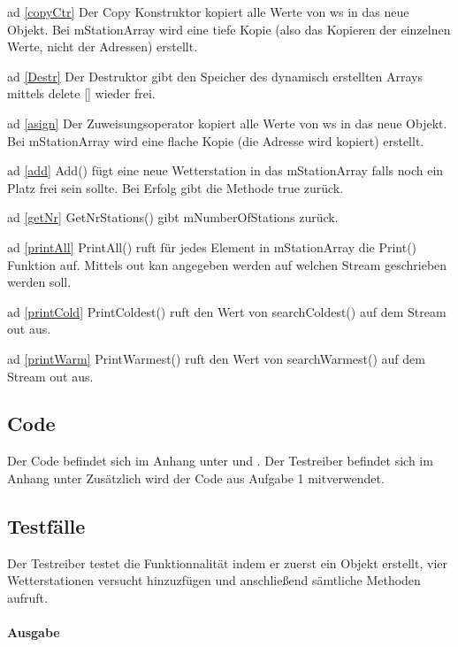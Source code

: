 \documentclass[10pt,a4paper, parskip=half]{scrartcl}
\begin{document}
ad \ref{copyCtr}
Der Copy Konstruktor kopiert alle Werte von ws in das neue Objekt. Bei mStationArray wird eine tiefe Kopie (also das Kopieren der einzelnen Werte, nicht der Adressen) erstellt.

ad \ref{Destr}
Der Destruktor gibt den Speicher des dynamisch erstellten Arrays mittels delete [] wieder frei.

ad \ref{asign}
Der Zuweisungsoperator kopiert alle Werte von ws in das neue Objekt. Bei mStationArray wird eine flache Kopie (die Adresse wird kopiert) erstellt.

ad \ref{add}
Add() fügt eine neue Wetterstation in das mStationArray falls noch ein Platz frei sein sollte. Bei Erfolg gibt die Methode true zurück.

ad \ref{getNr}
GetNrStations() gibt mNumberOfStations zurück.

ad \ref{printAll}
PrintAll() ruft für jedes Element in mStationArray die Print() Funktion auf. Mittels out kan angegeben werden auf welchen Stream geschrieben werden soll.

ad \ref{printCold}
PrintColdest() ruft den Wert von searchColdest() auf dem Stream out aus.

ad \ref{printWarm}
PrintWarmest() ruft den Wert von searchWarmest() auf dem Stream out aus.

\subsection{Code}

Der Code befindet sich im Anhang unter  und .
Der Testreiber befindet sich im Anhang unter 
Zusätzlich wird der Code aus Aufgabe 1 mitverwendet.

\newpage
\subsection{Testfälle}

Der Testreiber testet die Funktionnalität indem er zuerst ein Objekt erstellt, vier Wetterstationen versucht hinzuzfügen und anschließend sämtliche Methoden aufruft.
\paragraph{Ausgabe}


\end{document}
